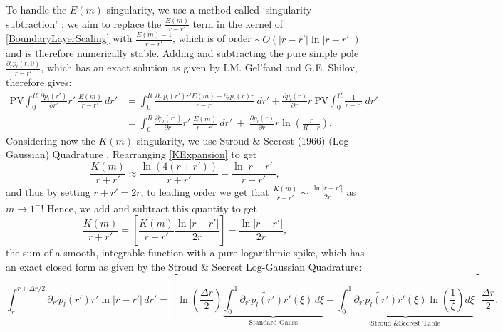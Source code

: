 \documentclass[11pt,a4paper]{article}
\begin{document}
	To handle the $E(m)$ singularity, we use a method called `singularity subtraction' : we aim to replace the $\frac{E(m)}{r-r'}$ term in the kernel of \eqref{BoundaryLayerScaling} with $\frac{E(m) - 1}{r-r'}$, which is of order $\sim O(|r-r'|\ln|r-r'|)$ and is therefore numerically stable. Adding and subtracting the pure simple pole $\frac{\partial _rp_l(r,0)}{r-r'}$, which has an exact solution as given by I.M. Gel’fand and G.E. Shilov, therefore gives:
	\begin{equation}
		\begin{aligned}
			\text{PV}\int^R _0 \frac{\partial p_l(r')}{\partial r'}r'\ \frac{E(m)}{r-r'}\ dr' &= \int^R _0 \frac{\partial _{r'}p_l(r')r'E(m) - \partial _{r}p_l(r)r}{r-r'}\ dr' + \frac{\partial p_l(r)}{\partial r}r\ \text{PV}\int^R _0 \frac{1}{r-r'}\ dr' \\
			&= \int^R _0 \frac{\partial p_l(r')}{\partial r'}r'\ \frac{E(m)}{r-r'}\ dr'\ +\  \frac{\partial p_l(r)}{\partial r}r \ln\left( \frac{r}{R - r} \right).
		\end{aligned}
	\end{equation}
	Considering now the $K(m)$ singularity, we use Stroud \& Secrest (1966) (Log-Gaussian) Quadrature . Rearranging \eqref{KExpansion} to get
	\begin{equation}
		\frac{K(m)}{r + r'} \approx \frac{\ln(4(r + r'))}{r + r'} - \frac{\ln|r-r'|}{r + r'},
	\end{equation}
	and thus by setting $r+r' = 2r$, to leading order we get that $\frac{K(m)}{r + r'} \sim \frac{\ln|r-r'|}{2r}$ as $m \to 1^-$! Hence, we add and subtract this quantity to get
	$$\frac{K(m)}{r + r'} = {\left[\frac{K(m)}{r + r'}   \frac{\ln|r-r'|}{2r} \right]} - \frac{\ln|r-r'|}{2r},$$
	the sum of a smooth, integrable function with a pure logarithmic spike, which has an exact closed form as given by the Stroud \& Secrest Log-Gaussian Quadrature:
	$$\int_{r}^{r + \Delta r/2} \partial _{r'}p_l(r')r'\ln\vert{}r - r'\vert{}\,dr' = \left[ \ln\left(\frac{\Delta r}{2}\right)\underbrace{\int_0^1 \tilde{\partial _{r'}p_l(r')r'}(\xi)\,d\xi}_{\text{Standard Gauss}} - \underbrace{\int_0^1 \tilde{\partial _{r'}p_l(r')r'}(\xi)\ln\left(\frac{1}{\xi}\right)d\xi}_{\text{Stroud \& Secrest Table}} \right] \frac{\Delta r}{2}.$$
	
	
\end{document}
